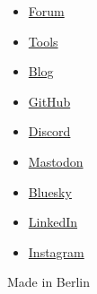 \begin{itemize}
\tightlist
\item
  \href{https://forum.typst.app}{Forum}
\item
  \href{/tools/}{Tools}
\item
  \href{/blog/}{Blog}
\item
  \href{https://github.com/typst/}{GitHub}
\item
  \href{https://discord.gg/2uDybryKPe}{Discord}
\item
  \href{https://mastodon.social/@typst}{Mastodon}
\item
  \href{https://bsky.app/profile/typst.app}{Bluesky}
\item
  \href{https://www.linkedin.com/company/typst/}{LinkedIn}
\item
  \href{https://instagram.com/typstapp/}{Instagram}
\end{itemize}

Made in Berlin
